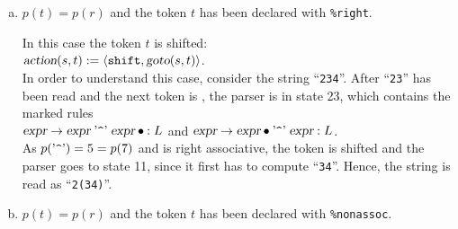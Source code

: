 \begin{enumerate}[(a)]
      Then the parser reduces with the rule $r$:
      \\[0.2cm]
      \hspace*{1.3cm}
      $\textsl{action}(s,t) := \langle \texttt{reduce}, r \rangle$.
      \\[0.2cm]
      To convince yourself that this is the right thing to do, consider the string ``\texttt{1-2-3}''.  After
      ``\texttt{1-2}'' has been read and the next token is \saquoted{-}, the parser is in state 20, which
      contains the marked rules
      \\[0.2cm]
      \hspace*{1.3cm}
      $\textsl{expr} \rightarrow \textsl{expr} \aquoted{-} \textsl{expr} \mdot: L$ \quad and \quad
      $\textsl{expr} \rightarrow \textsl{expr} \mdot \saquoted{-}\; \textsl{expr}: L$.
      \\[0.2cm]
      As $p(\saquoted{-}) = 2 = p(4)$ and \saquoted{-} is left associative, the parser reduces with rule (4), i.e.~it
      subtracts $2$ from $1$ first.  If it shifted the token \saquoted{-} instead, it would compute
      ``\texttt{1-(2-3)}'' instead of ``\texttt{(1-2)-3}''.
\item $p(t) = p(r)$ and the token $t$ has been declared with \texttt{\%right}.

      In this case the token $t$ is shifted:
      \\[0.2cm]
      \hspace*{1.3cm}
      $\textsl{action}(s,t) := \langle \texttt{shift}, \textsl{goto}(s,t) \rangle$.
      \\[0.2cm]
      In order to understand this case, consider the string ``\texttt{234}''.  After
      ``\texttt{23}'' has been read and the next token is , the parser is in
      state 23, which contains the marked rules
      \\[0.2cm]
      \hspace*{1.3cm}
      $\textsl{expr} \rightarrow \textsl{expr} \aquoted{\symbol{94}} \textsl{expr} \mdot: L$ \quad and \quad
      $\textsl{expr} \rightarrow \textsl{expr} \mdot \saquoted{\symbol{94}}\; \textsl{expr}: L$.
      \\[0.2cm]
      As $p(\saquoted{\symbol{94}}) = 5 = p(7)$ and  is right associative, the token
       is shifted and the parser goes to state 11, since it first has to compute
      ``\texttt{34}''.  Hence, the string is read as ``\texttt{2(34)}''.
\item $p(t) = p(r)$ and the token $t$ has been declared with \texttt{\%nonassoc}.


\end{enumerate}
